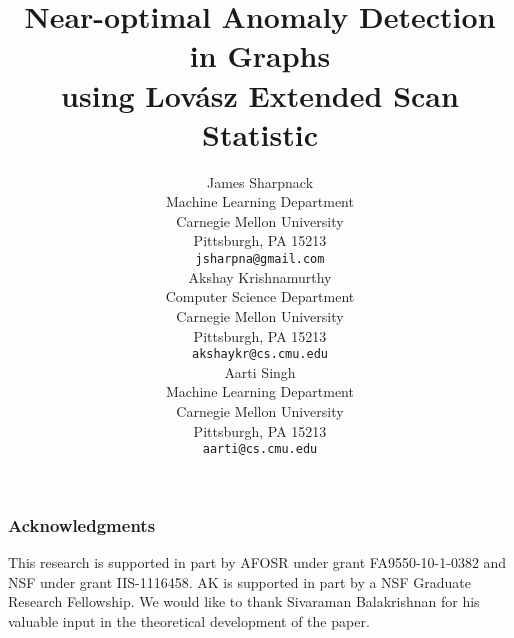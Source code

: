 \documentclass{article} %
\title{Near-optimal Anomaly Detection in Graphs\\ using Lov\'asz Extended Scan Statistic}
\author{
James Sharpnack \\
Machine Learning Department\\
Carnegie Mellon University\\
Pittsburgh, PA 15213 \\
\texttt{jsharpna@gmail.com} \\
\And
Akshay Krishnamurthy\\
Computer Science Department\\
Carnegie Mellon University\\
Pittsburgh, PA 15213 \\
\texttt{akshaykr@cs.cmu.edu} \\
\AND
Aarti Singh \\
Machine Learning Department\\
Carnegie Mellon University\\
Pittsburgh, PA 15213 \\
\texttt{aarti@cs.cmu.edu} \\
}
\begin{document}
\maketitle











\subsubsection*{Acknowledgments}
This research is supported in part by AFOSR under grant FA9550-10-1-0382 and NSF under grant IIS-1116458. 
AK is supported in part by a NSF Graduate Research Fellowship.
We would like to thank Sivaraman Balakrishnan for his valuable input in the theoretical development of the paper.

{\small


}

\end{document}
